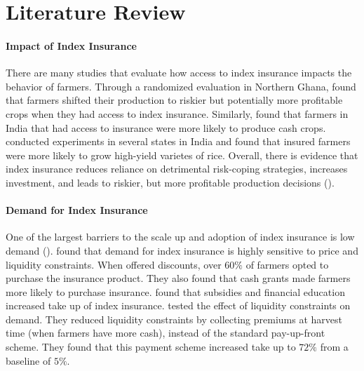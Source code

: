 \documentclass[11pt]{article}
\begin{document}
\section{Literature Review}
\paragraph{Impact of Index Insurance} There are many studies that evaluate how access to index insurance impacts the behavior of farmers. Through a randomized evaluation in Northern Ghana, \cite{karlan2014agricultural} found that farmers shifted their production to riskier but potentially more profitable crops when they had access to index insurance. Similarly, \cite{cole2013barriers} found that farmers in India that had access to insurance were more likely to produce cash crops. \cite{mobarak2013informal} conducted experiments in several states in India and found that insured farmers were more likely to grow high-yield varietes of rice. Overall, there is evidence that index insurance reduces reliance on detrimental risk-coping strategies, increases investment, and leads to riskier, but more profitable production decisions (\cite{jensen2017agricultural}). 

\paragraph{Demand for Index Insurance} One of the largest barriers to the scale up and adoption of index insurance is low demand (\cite{jensen2017agricultural}). \cite{cole2013barriers} found that demand for index insurance is highly sensitive to price and liquidity constraints. When offered discounts, over $60\%$ of farmers opted to purchase the insurance product. They also found that cash grants made farmers more likely to purchase insurance. \cite{cai2020subsidy} found that subsidies and financial education increased take up of index insurance. \cite{casaburi2018time} tested the effect of liquidity constraints on demand. They reduced liquidity constraints by collecting premiums at harvest time (when farmers have more cash), instead of the standard pay-up-front scheme. They found that this payment scheme increased take up to $72\%$ from a baseline of $5\%$. 
\end{document}

